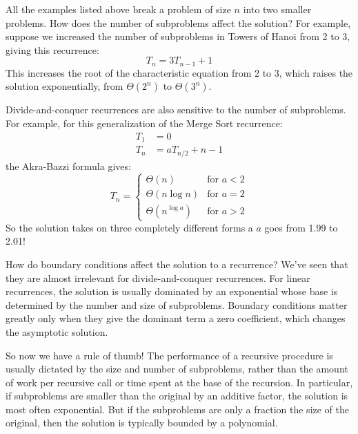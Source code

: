 All the examples listed above break a problem of size $n$ into two
smaller problems.  How does the number of subproblems affect the
solution?  For example, suppose we increased the number of subproblems
in Towers of Hanoi from 2 to 3, giving this recurrence:
\begin{equation*}
T_n = 3 T_{n-1} + 1
\end{equation*}
This increases the root of the characteristic equation from 2 to 3,
which raises the solution exponentially, from $\Theta(2^n)$ to
$\Theta(3^n)$.

Divide-and-conquer recurrences are also sensitive to the number of
subproblems.  For example, for this generalization of the Merge Sort
recurrence:
\begin{align*}
T_1 & = 0 \\
T_{n} & = a T_{n/2} + n - 1
\end{align*}
the Akra-Bazzi formula gives:
\begin{equation*}
T_n = \begin{cases}
\Theta(n) & \text{for $a < 2$} \\
\Theta(n \log n) & \text{for $a = 2$} \\
\Theta(n^{\log a}) & \text{for $a > 2$}
\end{cases}
\end{equation*}
So the solution takes on three completely different forms a $a$ goes
from 1.99 to 2.01!

How do boundary conditions affect the solution to a recurrence?  We've
seen that they are almost irrelevant for divide-and-conquer
recurrences.  For linear recurrences, the solution is usually
dominated by an exponential whose base is determined by the number and
size of subproblems.  Boundary conditions matter greatly only when
they give the dominant term a zero coefficient, which changes the
asymptotic solution.

So now we have a rule of thumb!  The performance of a recursive
procedure is usually dictated by the size and number of subproblems,
rather than the amount of work per recursive call or time spent at the
base of the recursion.  In particular, if subproblems are smaller than
the original by an additive factor, the solution is most often
exponential.  But if the subproblems are only a fraction the size of
the original, then the solution is typically bounded by a polynomial.

\endinput
